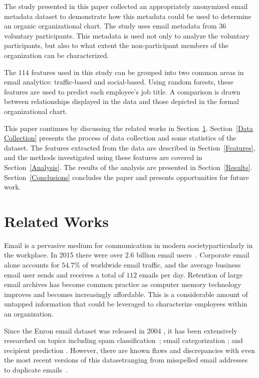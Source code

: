 \documentclass[10pt,twocolumn,conference]{IEEEtran}
\begin{document}
The study presented in this paper collected an appropriately anonymized email metadata dataset to demonstrate how this metadata could be used to determine an organic organizational chart.
The study uses email metadata from $36$ voluntary participants.
This metadata is used not only to analyze the voluntary participants, but also to what extent the non-participant members of the organization can be characterized.

The $114$ features used in this study can be grouped into two common areas in email analytics: traffic-based and social-based.
Using random forests, these features are used to predict each employee's job title.
A comparison is drawn between relationships displayed in the data and those depicted in the formal organizational chart.  

This paper continues by discussing the related works in Section~\ref{Related Works}.
Section~\ref{Data Collection} presents the process of data collection and some statistics of the dataset.
The features extracted from the data are described in Section~\ref{Features}, and the methods investigated using these features are covered in Section~\ref{Analysis}.
The results of the analysis are presented in Section~\ref{Results}.
Section~\ref{Conclusions} concludes the paper and presents opportunities for future work.  

\section{Related Works} \label{Related Works}

Email is a pervasive medium for communication in modern society\textemdash{}particularly in the workplace.
In 2015 there were over $2.6$ billion email users~\cite{radicati_emails_2015}.
Corporate email alone accounts for $54.7\%$ of worldwide email traffic, and the average business email user sends and receives a total of $112$ emails per day.
Retention of large email archives has become common practice as computer memory technology improves and becomes increasingly affordable.
This is a considerable amount of untapped information that could be leveraged to characterize employees within an organization.

Since the Enron email dataset was released in 2004 \cite{klimt_introducing_2004}, it has been extensively researched on topics including spam classification~\cite{martin_analyzing_2005}; email categorization \cite{he_novel_2014}; and recipient prediction \cite{sofershtein_predicting_2015}.
However, there are known flaws and discrepancies with even the most recent versions of this dataset\textemdash{}ranging from misspelled email addresses~\cite{nordbo_data_2014} to duplicate emails~\cite{waterman_big_2014}.
\end{document}
